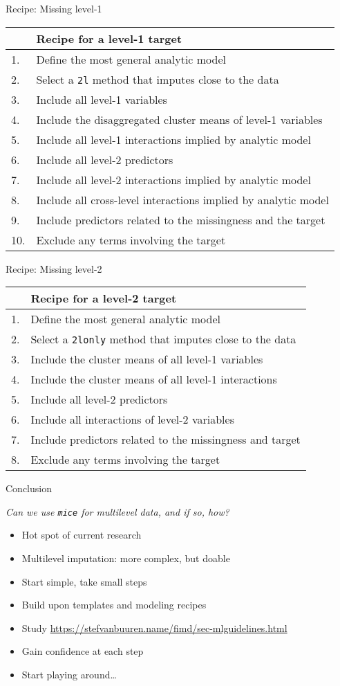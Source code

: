 \documentclass[ignorenonframetext,aspectratio=43]{beamer}
\providecommand{\tightlist}{%
  \setlength{\itemsep}{0pt}\setlength{\parskip}{0pt}}
\begin{document}
\begin{frame}[fragile]{Recipe: Missing level-1}

\begin{longtable}[]{@{}ll@{}}
\toprule
& Recipe for a level-1 target\tabularnewline
\midrule
\endhead
1. & Define the most general analytic model\tabularnewline
2. & Select a \texttt{2l} method that imputes close to the
data\tabularnewline
3. & Include all level-1 variables\tabularnewline
4. & Include the disaggregated cluster means of level-1
variables\tabularnewline
5. & Include all level-1 interactions implied by analytic
model\tabularnewline
6. & Include all level-2 predictors\tabularnewline
7. & Include all level-2 interactions implied by analytic
model\tabularnewline
8. & Include all cross-level interactions implied by analytic
model\tabularnewline
9. & Include predictors related to the missingness and the
target\tabularnewline
10. & Exclude any terms involving the target\tabularnewline
\bottomrule
\end{longtable}

\end{frame}

\begin{frame}[fragile]{Recipe: Missing level-2}

\begin{longtable}[]{@{}ll@{}}
\toprule
& Recipe for a level-2 target\tabularnewline
\midrule
\endhead
1. & Define the most general analytic model\tabularnewline
2. & Select a \texttt{2lonly} method that imputes close to the
data\tabularnewline
3. & Include the cluster means of all level-1 variables\tabularnewline
4. & Include the cluster means of all level-1
interactions\tabularnewline
5. & Include all level-2 predictors\tabularnewline
6. & Include all interactions of level-2 variables\tabularnewline
7. & Include predictors related to the missingness and
target\tabularnewline
8. & Exclude any terms involving the target\tabularnewline
\bottomrule
\end{longtable}

\end{frame}

\begin{frame}[fragile]{Conclusion}

\emph{Can we use \texttt{mice} for multilevel data, and if so, how?}

\begin{itemize}
\tightlist
\item
  Hot spot of current research
\item
  Multilevel imputation: more complex, but doable
\item
  Start simple, take small steps
\item
  Build upon templates and modeling recipes
\item
  Study \url{https://stefvanbuuren.name/fimd/sec-mlguidelines.html}
\item
  Gain confidence at each step
\item
  Start playing around\ldots{}
\end{itemize}

\end{frame}
\end{document}
